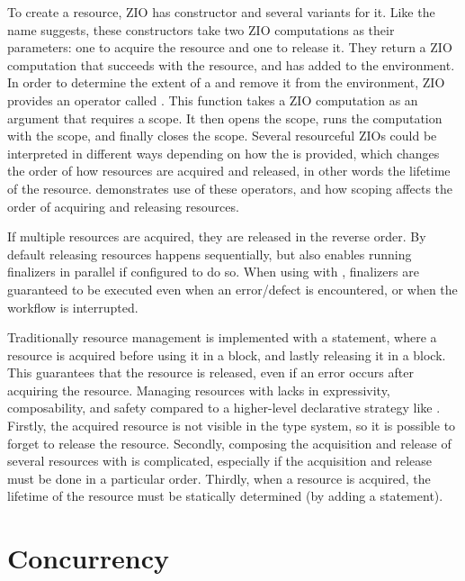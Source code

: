 To create a resource, ZIO has  constructor and several variants for it. Like the name suggests, these constructors take two ZIO computations as their parameters: one to acquire the resource and one to release it. They return a ZIO computation that succeeds with the resource, and has added  to the environment. In order to determine the extent of a  and remove it from the environment, ZIO provides an operator called . This function takes a ZIO computation as an argument that requires a scope. It then opens the scope, runs the computation with the scope, and finally closes the scope. Several resourceful ZIOs could be interpreted in different ways depending on how the  is provided, which changes the order of how resources are acquired and released, in other words the lifetime of the resource.  demonstrates use of these operators, and how scoping affects the order of acquiring and releasing resources.



If multiple resources are acquired, they are released in the reverse order. By default releasing resources happens sequentially, but  also enables running finalizers in parallel if configured to do so. When using  with , finalizers are guaranteed to be executed even when an error/defect is encountered, or when the workflow is interrupted.

Traditionally resource management is implemented with a  statement, where a resource is acquired before using it in a  block, and lastly releasing it in a  block. This guarantees that the resource is released, even if an error occurs after acquiring the resource. Managing resources with  lacks in expressivity, composability, and safety compared to a higher-level declarative strategy like . Firstly, the acquired resource is not visible in the type system, so it is possible to forget to release the resource. Secondly, composing the acquisition and release of several resources with  is complicated, especially if the acquisition and release must be done in a particular order. Thirdly, when a resource is acquired, the lifetime of the resource must be statically determined (by adding a  statement).


\section{Concurrency}

